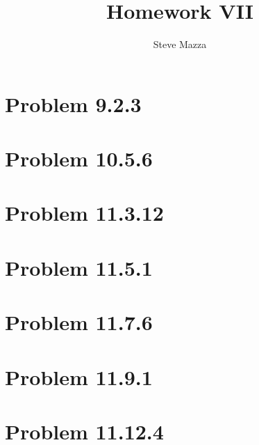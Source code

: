 \documentclass[letterpaper,10pt]{article}
\title{Homework VII}
\author{Steve Mazza}
\begin{document}
\maketitle

\section*{Problem 9.2.3}

\section*{Problem 10.5.6}

\section*{Problem 11.3.12}

\section*{Problem 11.5.1}

\section*{Problem 11.7.6}

\section*{Problem 11.9.1}

\section*{Problem 11.12.4}
\end{document}
